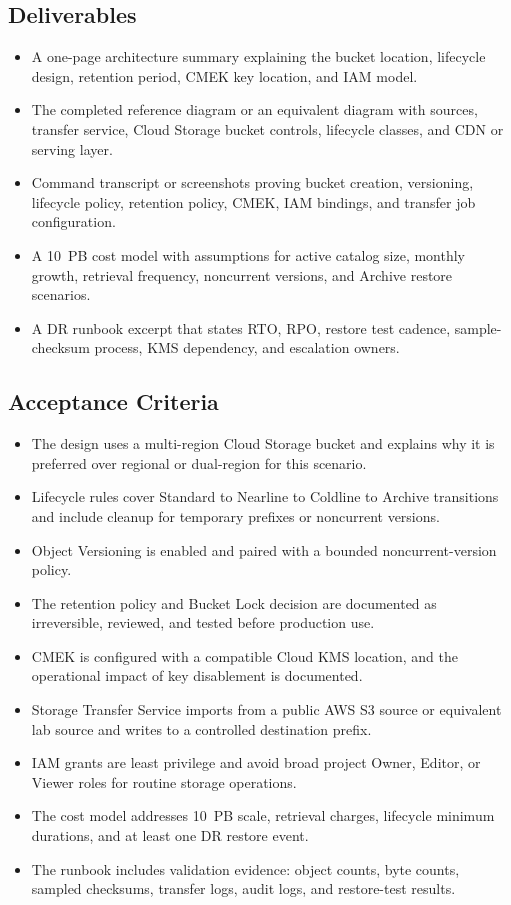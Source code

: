 \subsection*{Deliverables}
\begin{itemize}
    \item A one-page architecture summary explaining the bucket location, lifecycle design, retention period, CMEK key location, and IAM model.
    \item The completed reference diagram or an equivalent diagram with sources, transfer service, Cloud Storage bucket controls, lifecycle classes, and CDN or serving layer.
    \item Command transcript or screenshots proving bucket creation, versioning, lifecycle policy, retention policy, CMEK, IAM bindings, and transfer job configuration.
    \item A 10~PB cost model with assumptions for active catalog size, monthly growth, retrieval frequency, noncurrent versions, and Archive restore scenarios.
    \item A DR runbook excerpt that states RTO, RPO, restore test cadence, sample-checksum process, KMS dependency, and escalation owners.
\end{itemize}

\subsection*{Acceptance Criteria}
\begin{itemize}
    \item The design uses a multi-region Cloud Storage bucket and explains why it is preferred over regional or dual-region for this scenario.
    \item Lifecycle rules cover Standard to Nearline to Coldline to Archive transitions and include cleanup for temporary prefixes or noncurrent versions.
    \item Object Versioning is enabled and paired with a bounded noncurrent-version policy.
    \item The retention policy and Bucket Lock decision are documented as irreversible, reviewed, and tested before production use.
    \item CMEK is configured with a compatible Cloud KMS location, and the operational impact of key disablement is documented.
    \item Storage Transfer Service imports from a public AWS S3 source or equivalent lab source and writes to a controlled destination prefix.
    \item IAM grants are least privilege and avoid broad project Owner, Editor, or Viewer roles for routine storage operations.
    \item The cost model addresses 10~PB scale, retrieval charges, lifecycle minimum durations, and at least one DR restore event.
    \item The runbook includes validation evidence: object counts, byte counts, sampled checksums, transfer logs, audit logs, and restore-test results.
\end{itemize}

